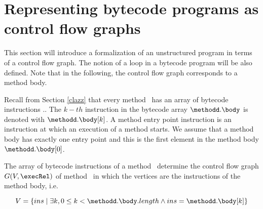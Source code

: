 \newtheorem{defEdge}{Definition}[section]
\newtheorem{defLoop}[defEdge]{Definition}
\newtheorem{defInter}[defEdge]{Definition}

\newtheorem{defInv}[defEdge]{Definition}
\newtheorem{defModif}[defEdge]{Definition}

\newtheorem{propPath}{Lemma}[section]

\section{Representing bytecode programs as control flow graphs}\label{prelim}

This section will introduce a formalization of an unstructured program in terms of a control flow graph.
The notion of a loop in a bytecode program will be also defined. Note that in the following,
the control flow graph corresponds to a method body. 


Recall from Section \ref{clazz} that every method \methodd \ has an array of bytecode instructions \methodd.\body.
The $k-th$ instruction in the bytecode array $\methodd.\body$ is  denoted with $\methodd.\body[k]$. A method entry point instruction is 
 an instruction at which an execution of a method starts.
 We assume that a method body has exactly one entry point
 and this is the first element in the method body $\methodd.\body[0]$.

 The array of bytecode instructions of a method \methodd \ determine the control flow graph $G( V , \execRel ) $  of method \methodd \ 
in which the vertices are the instructions of the method body, i.e. 

$$ V = \{ ins \mid \exists k,  0 \leq k < \methodd.\body.length \wedge ins = \methodd.\body[k] \}$$


